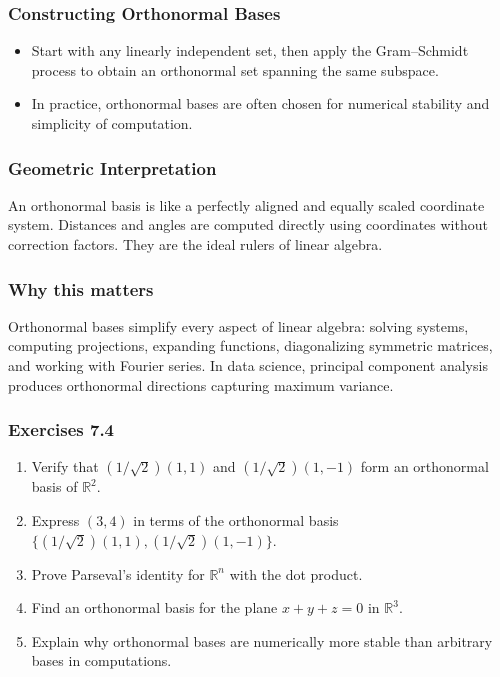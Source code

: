 \documentclass[
  12pt,
  a4paper,
]{article}
\begin{document}
\subsubsection{Constructing Orthonormal
Bases}\label{constructing-orthonormal-bases}

\begin{itemize}
\item
  Start with any linearly independent set, then apply the Gram--Schmidt
  process to obtain an orthonormal set spanning the same subspace.
\item
  In practice, orthonormal bases are often chosen for numerical
  stability and simplicity of computation.
\end{itemize}

\subsubsection{Geometric
Interpretation}\label{geometric-interpretation-16}

An orthonormal basis is like a perfectly aligned and equally scaled
coordinate system. Distances and angles are computed directly using
coordinates without correction factors. They are the ideal rulers of
linear algebra.

\subsubsection{Why this matters}\label{why-this-matters-27}

Orthonormal bases simplify every aspect of linear algebra: solving
systems, computing projections, expanding functions, diagonalizing
symmetric matrices, and working with Fourier series. In data science,
principal component analysis produces orthonormal directions capturing
maximum variance.

\subsubsection{Exercises 7.4}\label{exercises-74}

\begin{enumerate}
\def\labelenumi{\arabic{enumi}.}
\item
  Verify that \((1/\sqrt{2})(1,1)\) and \((1/\sqrt{2})(1,-1)\) form an
  orthonormal basis of \(\mathbb{R}^2\).
\item
  Express \((3,4)\) in terms of the orthonormal basis
  \(\{(1/\sqrt{2})(1,1), (1/\sqrt{2})(1,-1)\}\).
\item
  Prove Parseval's identity for \(\mathbb{R}^n\) with the dot product.
\item
  Find an orthonormal basis for the plane \(x+y+z=0\) in
  \(\mathbb{R}^3\).
\item
  Explain why orthonormal bases are numerically more stable than
  arbitrary bases in computations.
\end{enumerate}
\end{document}
